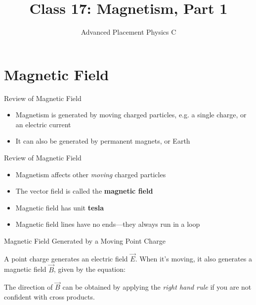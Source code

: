 \documentclass[12pt,aspectratio=169]{beamer}
\title{Class 17: Magnetism, Part 1}
\subtitle{Advanced Placement Physics C}
\begin{document}
\begin{frame}
  \maketitle
\end{frame}


\section{Magnetic Field}

\begin{frame}{Review of Magnetic Field}
  \begin{itemize}
  \item Magnetism is generated by moving charged particles, e.g.
    a single charge, or an electric current
  \item It can also be generated by permanent magnets, or Earth
  \end{itemize}
\end{frame}



\begin{frame}{Review of Magnetic Field}
  \begin{itemize}
  \item Magnetism affects other \emph{moving} charged particles
  \item The vector field is called the \textbf{magnetic field}
  \item Magnetic field has unit \textbf{tesla}
  \item Magnetic field lines have no ends---they always run in a loop
  \end{itemize}
\end{frame}



\begin{frame}{Magnetic Field Generated by a Moving Point Charge}
  \begin{center}
  \end{center}
  A point charge generates an electric field $\vec E$. When it's moving, it
  also generates a magnetic field $\vec B$, given by the equation:


  The direction of $\vec B$ can be obtained by applying the
  \emph{right hand rule} if you are not confident with cross products.
\end{frame}
\end{document}
